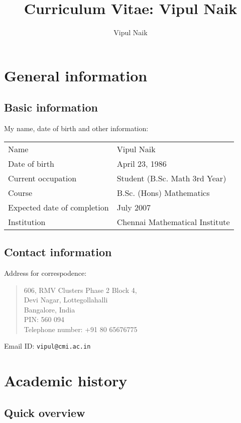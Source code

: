 \documentclass[a4paper]{amsart}
\title{Curriculum Vitae: Vipul Naik}
\author{Vipul Naik}
\begin{document}
\maketitle

\section{General information}

\subsection{Basic information}

My name, date of birth and other information:

\begin{tabular}{|l|l|}
  \hline
  Name & Vipul Naik\\
  Date of birth & April 23, 1986\\
  Current occupation & Student (B.Sc. Math 3rd Year) \\
  Course & B.Sc. (Hons) Mathematics\\
  Expected date of completion & July 2007 \\
  Institution & Chennai Mathematical Institute\\
  \hline
\end{tabular}

\subsection{Contact information}

Address for correspodence:

\begin{quote}
  606, RMV Clusters Phase 2 Block 4,\\
  Devi Nagar, Lottegollahalli\\
  Bangalore, India\\
  PIN: 560 094\\
  Telephone number: +91 80 65676775\\
\end{quote}

Email ID: {\tt vipul@cmi.ac.in}
\section{Academic history}

\subsection{Quick overview}
\end{document}
